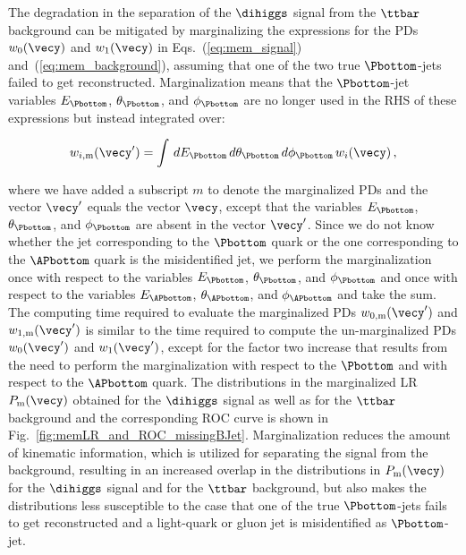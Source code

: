 The degradation in the separation of the $\dihiggs$ signal from the $\ttbar$ background can be mitigated 
by marginalizing the expressions for the PDs $w_{0}(\vecy)$ and $w_{1}(\vecy)$ in Eqs.~(\ref{eq:mem_signal}) and~(\ref{eq:mem_background}),
assuming that one of the two true $\Pbottom$-jets failed to get reconstructed.
Marginalization means that the $\Pbottom$-jet variables $E_{\Pbottom}$, $\theta_{\Pbottom}$, and $\phi_{\Pbottom}$
are no longer used in the RHS of these expressions but instead integrated over:
\begin{linenowrapper}
\begin{equation*}
w_{i,\textrm{m}}(\vecy') = \int \, dE_{\Pbottom} \, d\theta_{\Pbottom} \, d\phi_{\Pbottom} \, w_{i}(\vecy) \, ,
\end{equation*}
\end{linenowrapper}
where we have added a subscript $m$ to denote the marginalized PDs and the vector $\vecy'$ equals the vector $\vecy$,
except that the variables $E_{\Pbottom}$, $\theta_{\Pbottom}$, and $\phi_{\Pbottom}$ are absent in the vector $\vecy'$.
Since we do not know whether the jet corresponding to the $\Pbottom$ quark or the one corresponding to the $\APbottom$ quark is the misidentified jet,
we perform the marginalization once with respect to the variables $E_{\Pbottom}$, $\theta_{\Pbottom}$, and $\phi_{\Pbottom}$ 
and once with respect to the variables $E_{\APbottom}$, $\theta_{\APbottom}$, and $\phi_{\APbottom}$ and take the sum.
The computing time required to evaluate the marginalized PDs $w_{0,\textrm{m}}(\vecy')$ and $w_{1,\textrm{m}}(\vecy')$
is similar to the time required to compute the un-marginalized PDs $w_{0}(\vecy')$ and $w_{1}(\vecy')$,
except for the factor two increase that results from the need to perform the marginalization with respect to the $\Pbottom$ and with respect to the $\APbottom$ quark.
The distributions in the marginalized LR $P_{\textrm{m}}(\vecy)$ obtained for the $\dihiggs$ signal as well as for the $\ttbar$ background 
and the corresponding ROC curve is shown in Fig.~\ref{fig:memLR_and_ROC_missingBJet}.
Marginalization reduces the amount of kinematic information, which is utilized for separating the signal from the background,
resulting in an increased overlap in the distributions in $P_{\textrm{m}}(\vecy)$ for the $\dihiggs$ signal and for the $\ttbar$ background,
but also makes the distributions less susceptible to the case that one of the true $\Pbottom$-jets fails to get reconstructed
and a light-quark or gluon jet is misidentified as $\Pbottom$-jet.

